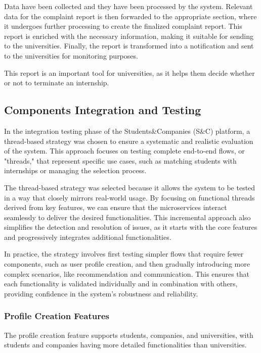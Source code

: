 Data have been collected and they have been processed by the system. Relevant data for the
complaint report is
then forwarded to the appropriate section, where it undergoes further processing to create the
finalized complaint report. This report is enriched with the necessary information, making it
suitable for sending to the universities. Finally, the report is transformed into a notification
and sent to the universities for monitoring purposes.

This report is an important tool for universities, as it helps them decide whether or not to
terminate an internship.

\newpage
\subsection{Components Integration and Testing}

In the integration testing phase of the Students\&Companies (S\&C) platform, a thread-based strategy
was chosen to ensure a systematic and realistic evaluation of the system. This approach focuses on
testing complete end-to-end flows, or "threads," that represent specific use cases, such as matching
students with internships or managing the selection process. 

The thread-based strategy was selected because it allows the system to be tested in a way that
closely mirrors real-world usage. By focusing on functional threads derived from key features,
we can ensure that the microservices interact seamlessly to deliver the desired functionalities.
This incremental approach also simplifies the detection and resolution of issues, as it starts
with the core features and progressively integrates additional functionalities.

In practice, the strategy involves first testing simpler flows that require fewer components,
such as user profile creation, and then gradually introducing more complex scenarios,
like recommendation and communication. This ensures that each functionality is validated
individually and in combination with others, providing confidence in the system’s robustness
and reliability.

\newpage
\subsubsection{Profile Creation Features}

The profile creation feature supports students, companies, and universities, with students
and companies having more detailed functionalities than universities.

